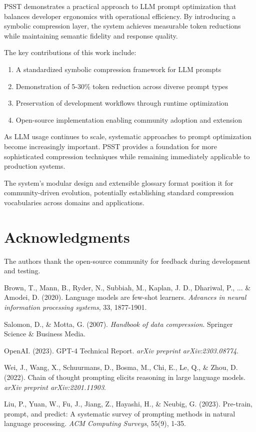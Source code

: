 \documentclass[11pt,twocolumn]{article}
\begin{document}
PSST demonstrates a practical approach to LLM prompt optimization that balances developer ergonomics with operational efficiency. By introducing a symbolic compression layer, the system achieves measurable token reductions while maintaining semantic fidelity and response quality.

The key contributions of this work include:

\begin{enumerate}
\item A standardized symbolic compression framework for LLM prompts
\item Demonstration of 5-30\% token reduction across diverse prompt types
\item Preservation of development workflows through runtime optimization
\item Open-source implementation enabling community adoption and extension
\end{enumerate}

As LLM usage continues to scale, systematic approaches to prompt optimization become increasingly important. PSST provides a foundation for more sophisticated compression techniques while remaining immediately applicable to production systems.

The system's modular design and extensible glossary format position it for community-driven evolution, potentially establishing standard compression vocabularies across domains and applications.

\section{Acknowledgments}

The authors thank the open-source community for feedback during development and testing.

\begin{thebibliography}{9}

Brown, T., Mann, B., Ryder, N., Subbiah, M., Kaplan, J. D., Dhariwal, P., ... \& Amodei, D. (2020). Language models are few-shot learners. \textit{Advances in neural information processing systems}, 33, 1877-1901.

Salomon, D., \& Motta, G. (2007). \textit{Handbook of data compression}. Springer Science \& Business Media.

OpenAI. (2023). GPT-4 Technical Report. \textit{arXiv preprint arXiv:2303.08774}.

Wei, J., Wang, X., Schuurmans, D., Bosma, M., Chi, E., Le, Q., \& Zhou, D. (2022). Chain of thought prompting elicits reasoning in large language models. \textit{arXiv preprint arXiv:2201.11903}.

Liu, P., Yuan, W., Fu, J., Jiang, Z., Hayashi, H., \& Neubig, G. (2023). Pre-train, prompt, and predict: A systematic survey of prompting methods in natural language processing. \textit{ACM Computing Surveys}, 55(9), 1-35.

\end{thebibliography}
\end{document}

